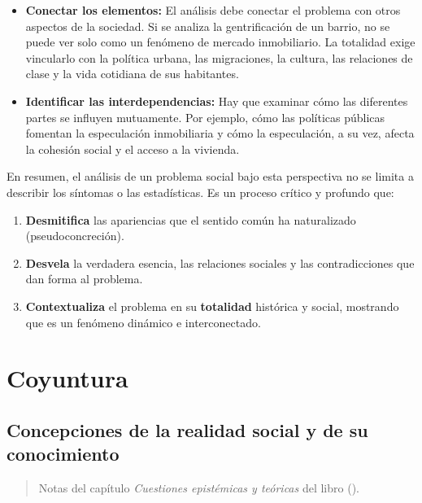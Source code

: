 \documentclass[
  letterpaper,
  DIV=11,
  numbers=noendperiod]{scrreprt}
\begin{document}
\begin{itemize}
\item
  \textbf{Conectar los elementos:} El análisis debe conectar el problema
  con otros aspectos de la sociedad. Si se analiza la gentrificación de
  un barrio, no se puede ver solo como un fenómeno de mercado
  inmobiliario. La totalidad exige vincularlo con la política urbana,
  las migraciones, la cultura, las relaciones de clase y la vida
  cotidiana de sus habitantes.
\item
  \textbf{Identificar las interdependencias:} Hay que examinar cómo las
  diferentes partes se influyen mutuamente. Por ejemplo, cómo las
  políticas públicas fomentan la especulación inmobiliaria y cómo la
  especulación, a su vez, afecta la cohesión social y el acceso a la
  vivienda.
\end{itemize}

En resumen, el análisis de un problema social bajo esta perspectiva no
se limita a describir los síntomas o las estadísticas. Es un proceso
crítico y profundo que:

\begin{enumerate}
\def\labelenumi{\arabic{enumi}.}
\item
  \textbf{Desmitifica} las apariencias que el sentido común ha
  naturalizado (pseudoconcreción).
\item
  \textbf{Desvela} la verdadera esencia, las relaciones sociales y las
  contradicciones que dan forma al problema.
\item
  \textbf{Contextualiza} el problema en su \textbf{totalidad} histórica
  y social, mostrando que es un fenómeno dinámico e interconectado.
\end{enumerate}

\chapter{Coyuntura}\label{coyuntura1}

\section{Concepciones de la realidad social y de su
conocimiento}\label{concepciones-de-la-realidad-social-y-de-su-conocimiento}

\begin{quote}
Notas del capítulo \emph{Cuestiones epistémicas y teóricas} del libro
().
\end{quote}
\end{document}
